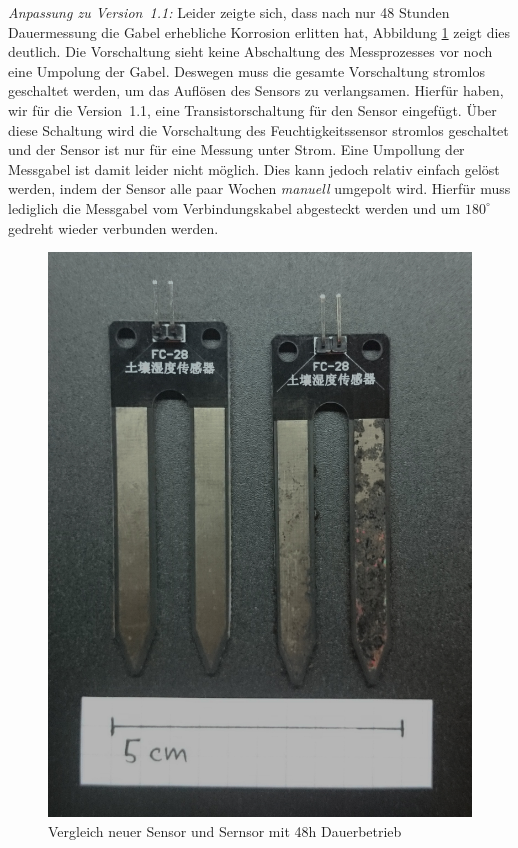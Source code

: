 \documentclass[]{IEEEtran}
\begin{document}
\emph{Anpassung zu Version~1.1:}
Leider zeigte sich, dass nach nur 48 Stunden Dauermessung die Gabel erhebliche Korrosion erlitten hat, Abbildung \ref{fig-SensorVergleich} zeigt dies deutlich.
Die Vorschaltung sieht keine Abschaltung des Messprozesses vor noch eine Umpolung der Gabel. 
Deswegen muss die gesamte Vorschaltung stromlos geschaltet werden, um das Auflösen des Sensors zu verlangsamen. 
Hierfür haben, wir für die Version~1.1, eine Transistorschaltung für den Sensor eingefügt. 
Über diese Schaltung wird die Vorschaltung des Feuchtigkeitssensor stromlos geschaltet und der Sensor ist nur für eine Messung unter Strom. 
Eine Umpollung der Messgabel ist damit leider nicht möglich. 
Dies kann jedoch relativ einfach gelöst werden, indem der Sensor alle paar Wochen \emph{manuell} umgepolt wird. 
Hierfür muss lediglich die Messgabel vom Verbindungskabel abgesteckt werden und um \begin{math}180^{\circ}\end{math} gedreht wieder verbunden werden.

\begin{figure}[!h]
	\centering
	\includegraphics[width=0.8\linewidth]{bilder/_fechtesensorVergleich0.jpg}
	\caption{Vergleich neuer Sensor und Sernsor mit 48h Dauerbetrieb}
	\label{fig-SensorVergleich}
\end{figure}
\end{document}
